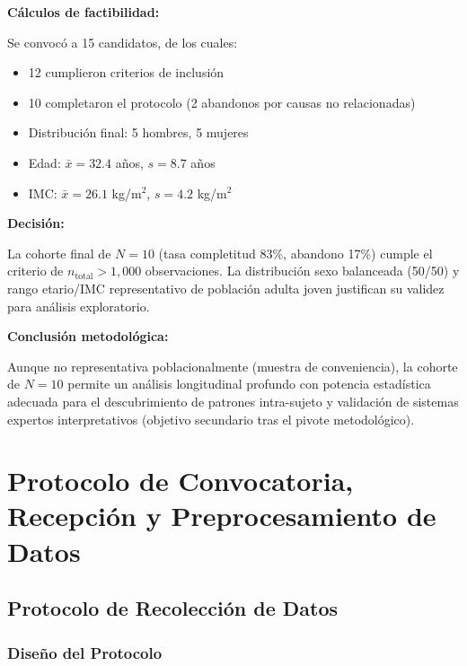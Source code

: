 \documentclass[12pt,letterpaper,twoside]{report}
\begin{document}
\begin{calculobox}
\textbf{Cálculos de factibilidad:}

Se convocó a 15 candidatos, de los cuales:
\begin{itemize}[noitemsep]
    \item 12 cumplieron criterios de inclusión
    \item 10 completaron el protocolo (2 abandonos por causas no relacionadas)
    \item Distribución final: 5 hombres, 5 mujeres
    \item Edad: $\bar{x}=32.4$ años, $s=8.7$ años
    \item IMC: $\bar{x}=26.1$ kg/m$^2$, $s=4.2$ kg/m$^2$
\end{itemize}
\end{calculobox}

\begin{decisionbox}
\textbf{Decisión:}

La cohorte final de $N=10$ (tasa completitud 83\%, abandono 17\%) cumple el criterio de $n_{\text{total}} > 1,000$ observaciones. La distribución sexo balanceada (50/50) y rango etario/IMC representativo de población adulta joven justifican su validez para análisis exploratorio.
\end{decisionbox}

\begin{conclusionbox}
\textbf{Conclusión metodológica:}

Aunque no representativa poblacionalmente (muestra de conveniencia), la cohorte de $N=10$ permite un análisis longitudinal profundo con potencia estadística adecuada para el descubrimiento de patrones intra-sujeto y validación de sistemas expertos interpretativos (objetivo secundario tras el pivote metodológico).
\end{conclusionbox}

\chapter{Protocolo de Convocatoria, Recepción y Preprocesamiento de Datos}

\section{Protocolo de Recolección de Datos}

\subsection{Diseño del Protocolo}
\end{document}
